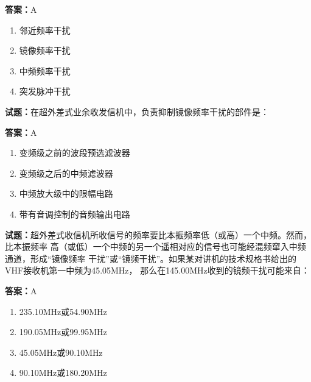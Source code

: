 \documentclass{ctexbook}
\begin{document}
\textbf{答案：}A 

\begin{enumerate}[leftmargin=3em]
  \item 邻近频率干扰 

  \item 镜像频率干扰 

  \item 中频频率干扰 

  \item 突发脉冲干扰 

\end{enumerate}





\vspace{1em}

\textbf{试题：}在超外差式业余收发信机中，负责抑制镜像频率干扰的部件是： 

\textbf{答案：}A 

\begin{enumerate}[leftmargin=3em]
  \item 变频级之前的波段预选滤波器 


  \item 变频级之后的中频滤波器 

  \item 中频放大级中的限幅电路 

  \item 带有音调控制的音频输出电路 

\end{enumerate}





\vspace{1em}

\textbf{试题：}超外差式收信机所收信号的频率要比本振频率低（或高）一个中频。然而，比本振频率
高（或低）一个中频的另一个遥相对应的信号也可能经混频窜入中频通道，形成“镜像频率
干扰”或“镜频干扰”。如果某对讲机的技术规格书给出的VHF接收机第一中频为45.05MHz，
那么在145.00MHz收到的镜频干扰可能来自： 

\textbf{答案：}A 

\begin{enumerate}[leftmargin=3em]
  \item 235.10MHz或54.90MHz 

  \item 190.05MHz或99.95MHz 

  \item 45.05MHz或90.10MHz 

  \item 90.10MHz或180.20MHz 

\end{enumerate}
\end{document}
